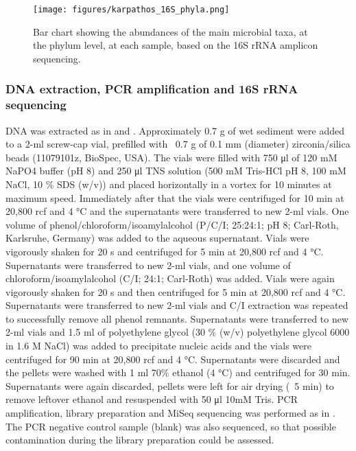    \begin{figure}[h]
      \centering
      \texttt{[image: figures/karpathos\_16S\_phyla.png]}
      \caption[Tristomo marsh in Karpathos overview]{
         Bar chart showing the abundances of the main microbial taxa, at the phylum level, at each sample, based on the 16S rRNA amplicon sequencing. 
      }
      \label{fig:karpathos-16S}
   \end{figure}   


\subsubsection*{DNA extraction, PCR amplification and 16S rRNA sequencing}

   DNA was extracted as in \citep{henckel_molecular_1999} and \citep{lueders_enhanced_2004}. 
   Approximately 0.7 g of wet sediment were added to a 2-ml screw-cap vial, prefilled with ~0.7 g of 0.1 mm (diameter) zirconia/silica beads (11079101z, BioSpec, USA). 
   The vials were filled with 750 μl of 120 mM NaPO4 buffer (pH 8) and 250 μl TNS solution (500 mM Tris-HCl pH 8, 100 mM NaCl, 10 \% SDS (w/v)) and placed horizontally in a vortex for 10 minutes at maximum speed. 
   Immediately after that the vials were centrifuged for 10 min at 20,800 rcf and 4 °C and the supernatants were transferred to new 2-ml vials. 
   One volume of phenol/chloroform/isoamylalcohol (P/C/I; 25:24:1; pH 8; Carl-Roth, Karlsruhe, Germany) was added to the aqueous supernatant. 
   Vials were vigorously shaken for 20 s and centrifuged for 5 min at 20,800 rcf and 4 °C. 
   Supernatants were transferred to new 2-ml vials, and one volume of chloroform/isoamylalcohol (C/I; 24:1; Carl-Roth) was added. 
   Vials were again vigorously shaken for 20 s and then centrifuged for 5 min at 20,800 rcf and 4 °C. 
   Supernatants were transferred to new 2-ml vials and C/I extraction was repeated to successfully remove all phenol remnants. 
   Supernatants were transferred to new 2-ml vials and 1.5 ml of polyethylene glycol (30 \% (w/v) polyethylene glycol 6000 in 1.6 M NaCl) was added to precipitate nucleic acids and the vials were centrifuged for 90 min at 20,800 rcf and 4 °C. 
   Supernatants were discarded and the pellets were washed with 1 ml 70\% ethanol (4 °C) and centrifuged for 30 min. 
   Supernatants were again discarded, pellets were left for air drying (~5 min) to remove leftover ethanol and resuspended with 50 μl 10mM Tris. 
   PCR amplification, library preparation and MiSeq sequencing was performed as in \citep{pavloudi2017sediment}. 
   The PCR negative control sample (blank) was also sequenced, so that possible contamination during the library preparation could be assessed. 
